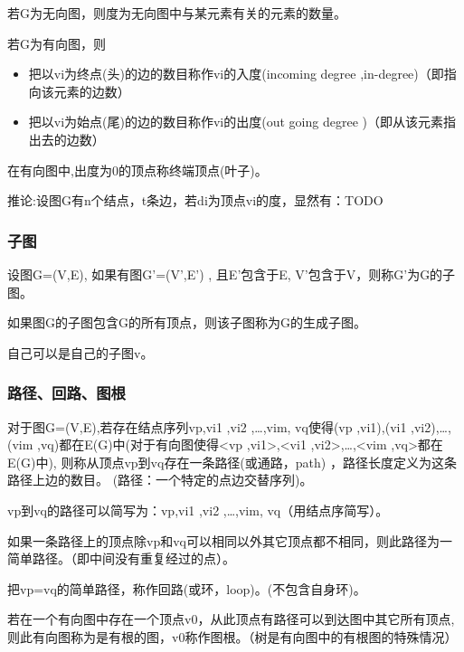 \documentclass[AutoFakeBold]{LZUThesis2007}
\begin{document}
若G为无向图，则度为无向图中与某元素有关的元素的数量。

若G为有向图，则
\begin{itemize}
	\item 把以vi为终点(头)的边的数目称作vi的入度(incoming degree ,in-degree)（即指向该元素的边数）
	\item 把以vi为始点(尾)的边的数目称作vi的出度(out going degree )（即从该元素指出去的边数）
\end{itemize}

在有向图中,出度为0的顶点称终端顶点(叶子)。

推论:设图G有n个结点，t条边，若di为顶点vi的度，显然有：TODO



			\subsubsection{子图}
设图G=(V,E), 如果有图G'=(V',E') , 且E'包含于E, V'包含于V，则称G'为G的子图。

如果图G的子图包含G的所有顶点，则该子图称为G的生成子图。

自己可以是自己的子图v。

			\subsubsection{路径、回路、图根}
对于图G=(V,E),若存在结点序列vp,vi1 ,vi2 ,…,vim, vq使得(vp ,vi1),(vi1 ,vi2),…,(vim ,vq)都在E(G)中(对于有向图使得<vp ,vi1>,<vi1 ,vi2>,…,<vim ,vq>都在E(G)中), 则称从顶点vp到vq存在一条路径(或通路，path) ，路径长度定义为这条路径上边的数目。 (路径：一个特定的点边交替序列)。

vp到vq的路径可以简写为：vp,vi1 ,vi2 ,…,vim, vq（用结点序简写）。

如果一条路径上的顶点除vp和vq可以相同以外其它顶点都不相同，则此路径为一简单路径。（即中间没有重复经过的点）。

把vp=vq的简单路径，称作回路(或环，loop)。(不包含自身环)。

若在一个有向图中存在一个顶点v0，从此顶点有路径可以到达图中其它所有顶点,则此有向图称为是有根的图，v0称作图根。（树是有向图中的有根图的特殊情况）
\end{document}
